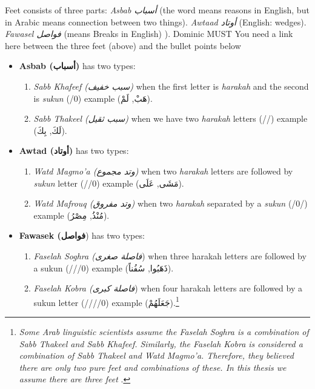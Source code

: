 Feet consists of three parts:
\textit{Asbab \textarabic{أسباب}} (the word means reasons in English, but in Arabic means connection between two things).
\textit{Awtaad \textarabic{أوتاد}} (English: wedges). 
\textit{Fawasel \textarabic{فواصل}} (means Breaks in English) ).
Dominic MUST You need a link here between the three feet (above) and the bullet points below

\begin{itemize}
  \item \textbf{Asbab (\textarabic{أسباب})} has two types:
  \begin{enumerate}
    \item \textit{Sabb Khafeef (\textarabic{سبب خفيف})} when the first letter is \textit{harakah} and the second is \textit{sukun} (/0) example (\textarabic{هَبْ, لَمْ}).
    \item \textit{Sabb Thakeel (\textarabic{سبب ثقيل})} when we have two \textit{harakah} letters (//) example (\textarabic{لَكَ, بِكَ}).
  \end{enumerate}
  \item \textbf{Awtad (\textarabic{أوتاد})} has two types:
  \begin{enumerate}
    \item \textit{Watd Magmo'a (\textarabic{وتد مجموع})} when two \textit{harakah} letters are followed by \textit{sukun} letter (//0) example (\textarabic{مَشَى, عَلَى}).
    \item \textit{Watd Mafrouq (\textarabic{وتد مفروق})} when  two \textit{harakah} separated by a \textit{sukun} (/0/) example (\textarabic{مُنْذُ, مِصْرُ}).
  \end{enumerate}
  \item \textbf{Fawasek (\textarabic{فواصل}}) has two types:
  \begin{enumerate}
    \item \textit{Faselah Soghra (\textarabic{فاصلة صغرى}})  when three harakah letters are followed by a sukun (///0) example (\textarabic{ذَهَبُوا, سُفُناً}).
    \item \textit{Faselah Kobra (\textarabic{فاصلة كبرى}}) when four harakah letters are followed by a sukun letter (////0) example (\textarabic{جَعَلَهُمْ}).\footnote{\textit{Some Arab linguistic scientists assume the Faselah Soghra is a combination of Sabb Thakeel and Sabb Khafeef. Similarly, the Faselah Kobra is considered a combination of Sabb Thakeel and Watd Magmo'a. Therefore, they believed there are only two pure feet and combinations of these. In this thesis we assume there are three feet }.}
  \end{enumerate}
\end{itemize}

